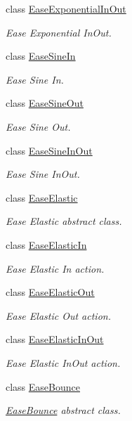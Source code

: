 \begin{DoxyCompactItemize}
class \hyperlink{classEaseExponentialInOut}{Ease\+Exponential\+In\+Out}
\begin{DoxyCompactList}\small\item\em Ease Exponential In\+Out. \end{DoxyCompactList}\item 
class \hyperlink{classEaseSineIn}{Ease\+Sine\+In}
\begin{DoxyCompactList}\small\item\em Ease Sine In. \end{DoxyCompactList}\item 
class \hyperlink{classEaseSineOut}{Ease\+Sine\+Out}
\begin{DoxyCompactList}\small\item\em Ease Sine Out. \end{DoxyCompactList}\item 
class \hyperlink{classEaseSineInOut}{Ease\+Sine\+In\+Out}
\begin{DoxyCompactList}\small\item\em Ease Sine In\+Out. \end{DoxyCompactList}\item 
class \hyperlink{classEaseElastic}{Ease\+Elastic}
\begin{DoxyCompactList}\small\item\em Ease Elastic abstract class. \end{DoxyCompactList}\item 
class \hyperlink{classEaseElasticIn}{Ease\+Elastic\+In}
\begin{DoxyCompactList}\small\item\em Ease Elastic In action. \end{DoxyCompactList}\item 
class \hyperlink{classEaseElasticOut}{Ease\+Elastic\+Out}
\begin{DoxyCompactList}\small\item\em Ease Elastic Out action. \end{DoxyCompactList}\item 
class \hyperlink{classEaseElasticInOut}{Ease\+Elastic\+In\+Out}
\begin{DoxyCompactList}\small\item\em Ease Elastic In\+Out action. \end{DoxyCompactList}\item 
class \hyperlink{classEaseBounce}{Ease\+Bounce}
\begin{DoxyCompactList}\small\item\em \hyperlink{classEaseBounce}{Ease\+Bounce} abstract class. \end{DoxyCompactList}\item 

\end{DoxyCompactItemize}
